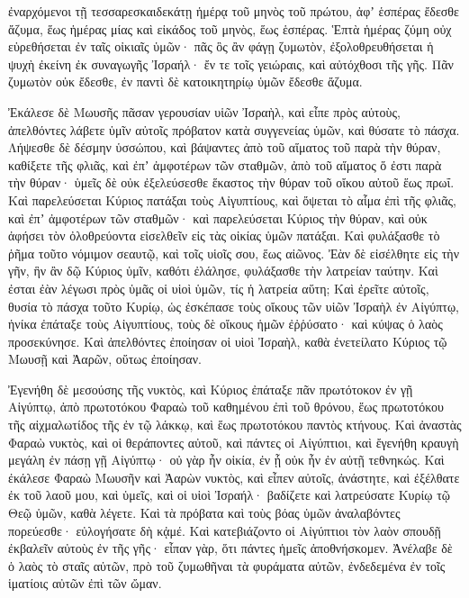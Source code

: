 {ἐναρχόμενοι τῇ τεσσαρεσκαιδεκάτῃ ἡμέρᾳ τοῦ μηνὸς τοῦ πρώτου, ἀφʼ ἑσπέρας ἔδεσθε ἄζυμα, ἕως ἡμέρας μίας καὶ εἰκάδος τοῦ μηνὸς, ἕως ἑσπέρας.
Ἑπτὰ ἡμέρας ζύμη οὐχ εὑρεθήσεται ἐν ταῖς οἰκιαῖς ὑμῶν· πᾶς ὃς ἂν φάγῃ ζυμωτὸν, ἐξολοθρευθήσεται ἡ ψυχὴ ἐκείνη ἐκ συναγωγῆς Ἰσραήλ· ἔν τε τοῖς γειώραις, καὶ αὐτόχθοσι τῆς γῆς.
Πᾶν ζυμωτὸν οὐκ ἔδεσθε, ἐν παντὶ δὲ κατοικητηρίῳ ὑμῶν ἔδεσθε ἄζυμα.
\par }{\PP {}Ἐκάλεσε δὲ Μωυσῆς πᾶσαν γερουσίαν υἱῶν Ἰσραὴλ, καὶ εἶπε πρὸς αὐτοὺς, ἀπελθόντες λάβετε ὑμῖν αὐτοῖς πρόβατον κατὰ συγγενείας ὑμῶν, καὶ θύσατε τὸ πάσχα.
Λήψεσθε δὲ δέσμην ὑσσώπου, καὶ βάψαντες ἀπὸ τοῦ αἵματος τοῦ παρὰ τὴν θύραν, καθίξετε τῆς φλιᾶς, καὶ ἐπʼ ἀμφοτέρων τῶν σταθμῶν, ἀπὸ τοῦ αἵματος ὅ ἐστι παρὰ τὴν θύραν· ὑμεῖς δὲ οὐκ ἐξελεύσεσθε ἕκαστος τὴν θύραν τοῦ οἴκου αὐτοῦ ἕως πρωΐ.
Καὶ παρελεύσεται Κύριος πατάξαι τοὺς Αἰγυπτίους, καὶ ὄψεται τὸ αἷμα ἐπὶ τῆς φλιᾶς, καὶ ἐπʼ ἀμφοτέρων τῶν σταθμῶν· καὶ παρελεύσεται Κύριος τὴν θύραν, καὶ οὐκ ἀφήσει τὸν ὀλοθρεύοντα εἰσελθεῖν εἰς τὰς οἰκίας ὑμῶν πατάξαι.
Καὶ φυλάξασθε τὸ ῥῆμα τοῦτο νόμιμον σεαυτῷ, καὶ τοῖς υἱοῖς σου, ἕως αἰῶνος.
Ἐὰν δὲ εἰσέλθητε εἰς τὴν γῆν, ἣν ἂν δῷ Κύριος ὑμῖν, καθότι ἐλάλησε, φυλάξασθε τὴν λατρείαν ταύτην.
Καὶ ἐσται ἐὰν λέγωσι πρὸς ὑμᾶς οἱ υἱοὶ ὑμῶν, τίς ἡ λατρεία αὕτη;
Καὶ ἐρεῖτε αὐτοῖς, θυσία τὸ πάσχα τοῦτο Κυρίῳ, ὡς ἐσκέπασε τοὺς οἴκους τῶν υἱῶν Ἰσραὴλ ἐν Αἰγύπτῳ, ἡνίκα ἐπάταξε τοὺς Αἰγυπτίους, τοὺς δὲ οἴκους ἡμῶν ἐῤῥύσατο· καὶ κύψας ὁ λαὸς προσεκύνησε.
Καὶ ἀπελθόντες ἐποίησαν οἱ υἱοὶ Ἰσραὴλ, καθὰ ἐνετείλατο Κύριος τῷ Μωυσῇ καὶ Ἀαρῶν, οὕτως ἐποίησαν.
\par }{\PP {}Ἐγενήθη δὲ μεσούσης τῆς νυκτὸς, καὶ Κύριος ἐπάταξε πᾶν πρωτότοκον ἐν γῇ Αἰγύπτῳ, ἀπὸ πρωτοτόκου Φαραὼ τοῦ καθημένου ἐπὶ τοῦ θρόνου, ἕως πρωτοτόκου τῆς αἰχμαλωτίδος τῆς ἐν τῷ λάκκῳ, καὶ ἕως πρωτοτόκου παντὸς κτήνους.
Καὶ ἀναστὰς Φαραὼ νυκτὸς, καὶ οἱ θεράποντες αὐτοῦ, καὶ πάντες οἱ Αἰγύπτιοι, καὶ ἔγενήθη κραυγὴ μεγάλη ἐν πάσῃ γῇ Αἰγύπτῳ· οὐ γὰρ ἦν οἰκία, ἐν ᾗ οὐκ ἦν ἐν αὐτῇ τεθνηκώς.
Καὶ ἐκάλεσε Φαραὼ Μωυσῆν καὶ Ἀαρὼν νυκτὸς, καὶ εἶπεν αὐτοῖς, ἀνάστητε, καὶ ἐξέλθατε ἐκ τοῦ λαοῦ μου, καὶ ὑμεῖς, καὶ οἱ υἱοὶ Ἰσραήλ· βαδίζετε καὶ λατρεύσατε Κυρίῳ τῷ Θεῷ ὑμῶν, καθὰ λέγετε.
Καὶ τὰ πρόβατα καὶ τοὺς βόας ὑμῶν ἀναλαβόντες πορεύεσθε· εὐλογήσατε δὴ κᾀμέ.
Καὶ κατεβιάζοντο οἱ Αἰγύπτιοι τὸν λαὸν σπουδῇ ἐκβαλεῖν αὐτοὺς ἐν τῆς γῆς· εἶπαν γὰρ, ὅτι πάντες ἡμεῖς ἀποθνήσκομεν.
Ἀνέλαβε δὲ ὁ λαὸς τὸ σταῖς αὐτῶν, πρὸ τοῦ ζυμωθῆναι τὰ φυράματα αὐτῶν, ἐνδεδεμένα ἐν τοῖς ἱματίοις αὐτῶν ἐπὶ τῶν ὤμαν.
}
